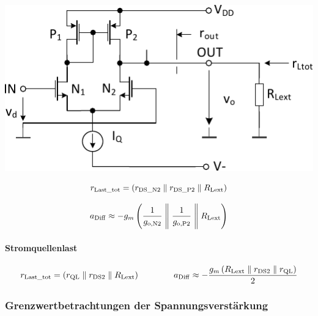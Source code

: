 \begin{minipage}[t]{0.45\columnwidth}
    \includegraphics[width=\columnwidth, align=t]{images/09_differenzstufe_kleinsignal_verstaerkung_stromspiegel.pdf}
\end{minipage}
\hfill
\begin{minipage}[t]{0.5\columnwidth}
    \[
        r_{\rm Last\_tot} =  \left( r_{\rm DS\_N2} \parallel r_{\rm DS\_P2} \parallel R_{\rm Lext} \right)
    \]

    \vspace{-0.2cm}

    \[
        a_{\rm Diff} \approx - g_m \left(\frac{1}{g_{\rm o, N2}} \Biggm\Vert \frac{1}{g_{\rm o, P2}} \Biggm\Vert R_{\rm Lext}\right)
    \]
\end{minipage}




\paragraph{Stromquellenlast}    %

\vspace{-0.2cm}



\[
    r_{\rm Last\_tot} =  \left( r_{\rm QL} \parallel r_{\rm DS2} \parallel R_{\rm Lext} \right) \qquad \qquad
    a_{\rm Diff} \approx - \frac{ g_m \left( R_{\rm Lext} \parallel r_{\rm DS2} \parallel r_{\rm QL} \right) }{2}
\]



\subsubsection{Grenzwertbetrachtungen der Spannungsverstärkung}

